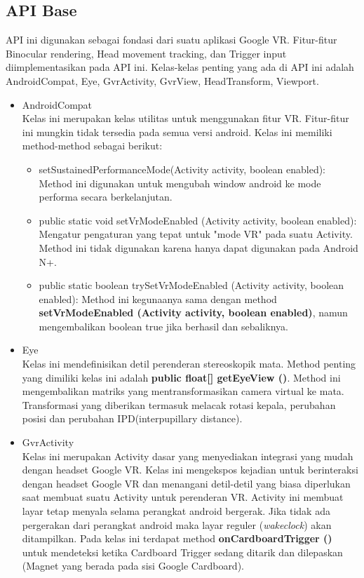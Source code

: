\subsection{API Base}
\label{sec:api_base}
\cite{google_vr_developers}
API ini digunakan sebagai fondasi dari suatu aplikasi Google VR. Fitur-fitur Binocular rendering, Head movement tracking, dan Trigger input diimplementasikan pada API ini. Kelas-kelas penting yang ada di API ini adalah AndroidCompat, Eye, GvrActivity, GvrView, HeadTransform, Viewport.
\begin{itemize}
	\item AndroidCompat\\
Kelas ini merupakan kelas utilitas untuk menggunakan fitur VR. Fitur-fitur ini mungkin tidak tersedia pada semua versi android. Kelas ini memiliki method-method sebagai berikut:
\begin{itemize}
	\item setSustainedPerformanceMode(Activity activity, boolean enabled): \\
	Method ini digunakan untuk mengubah window android ke mode performa secara berkelanjutan.
	\item public static void setVrModeEnabled (Activity activity, boolean enabled): \\
	Mengatur pengaturan yang tepat untuk "mode VR" pada suatu Activity. Method ini tidak digunakan karena hanya dapat digunakan pada Android N+.
	\item public static boolean trySetVrModeEnabled (Activity activity, boolean enabled): 
	Method ini kegunaanya sama dengan method \textbf{setVrModeEnabled (Activity activity, boolean enabled)}, namun mengembalikan boolean true jika berhasil dan sebaliknya.
\end{itemize}
	\item Eye\\
Kelas ini mendefinisikan detil perenderan stereoskopik mata. Method penting yang dimiliki kelas ini adalah \textbf{public float[] getEyeView ()}. Method ini mengembalikan matriks yang mentransformasikan camera virtual ke mata. Transformasi yang diberikan termasuk melacak rotasi kepala, perubahan posisi dan perubahan IPD(interpupillary distance).
	\item GvrActivity\\
Kelas ini merupakan Activity dasar yang menyediakan integrasi yang mudah dengan headset Google VR. Kelas ini mengekspos kejadian untuk berinteraksi dengan headset Google VR dan menangani detil-detil yang biasa diperlukan saat membuat suatu Activity untuk perenderan VR. Activity ini membuat layar tetap menyala selama perangkat android bergerak. Jika tidak ada pergerakan dari perangkat android maka layar reguler (\textit{wakeclock}) akan ditampilkan. Pada kelas ini terdapat method \textbf{onCardboardTrigger ()} untuk mendeteksi ketika Cardboard Trigger sedang ditarik dan dilepaskan (Magnet yang berada pada sisi Google Cardboard).

\end{itemize}
